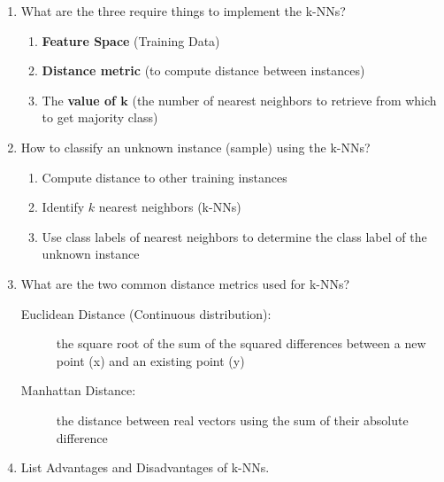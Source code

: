 \documentclass[12pt]{article}
\newenvironment{QandA}{\begin{enumerate}[label=\bfseries\arabic*.]\bfseries}
{\end{enumerate}}
\newenvironment{answered}{\par\normalfont\color{Sepia}}{}
\begin{document}
\begin{QandA}
    \item What are the three require things to implement the k-NNs?
    \begin{answered}
        \begin{enumerate}
            \item \textbf{Feature Space} (Training Data)
            \item \textbf{Distance metric} (to compute distance between instances)
            \item The \textbf{value of $\mathbf{k}$} (the number of nearest neighbors to retrieve from which to get majority class)
        \end{enumerate}
    \end{answered}

    \item How to classify an unknown instance (sample) using the k-NNs?
    \begin{answered}
        \begin{enumerate}
            \item Compute distance to other training instances
            \item Identify $k$ nearest neighbors (k-NNs)
            \item Use class labels of nearest neighbors to determine the class label of the unknown instance
        \end{enumerate}
    \end{answered}

    \item What are the two common distance metrics used for k-NNs?
    \begin{answered}
        \begin{description}
            \item[Euclidean Distance (Continuous distribution):] the square root of the sum of the squared differences between a new point (x) and an existing point (y)
            \item[Manhattan Distance:] the distance between real vectors using the sum of their absolute difference
        \end{description}
    \end{answered}

    \item List Advantages and Disadvantages of k-NNs.
    \begin{answered}

\end{answered}
\end{QandA}
\end{document}

